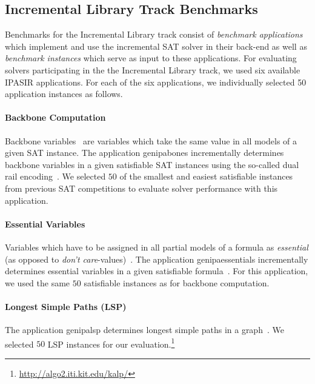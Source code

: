 \documentclass{elsarticle}
\begin{document}
\subsection{Incremental Library Track Benchmarks}

Benchmarks for the Incremental Library track consist of \emph{benchmark applications} which implement and use the incremental SAT solver in their back-end as well as \emph{benchmark instances} which serve as input to these applications. 
For evaluating solvers participating in the 
the Incremental Library track, we used six available IPASIR applications.
For each of the six applications, we individually selected 50 application instances as follows. 

\paragraph{Backbone Computation}

Backbone variables~\cite{Monasson:1999,Janota:2015:Backbones} are variables which take the same value in all models of a given SAT instance.
The application \textsf{genipabones} incrementally determines backbone variables in a given satisfiable SAT instances using the so-called 
dual rail encoding~\cite{Balyo:2015:SATRace}.
We selected $50$ of the smallest and easiest satisfiable instances from previous SAT competitions to evaluate solver performance with this application. 

\paragraph{Essential Variables}

Variables which have to be assigned in all partial models of a formula as \emph{essential} (as opposed to \emph{don't care}-values)~\cite{Bryant:1987:Essentials}. 
The application \textsf{genipaessentials} incrementally determines essential variables in a given satisfiable formula~\cite{Balyo:2015:SATRace}. 
For this application, we used the same $50$  satisfiable instances as for  backbone computation.

\paragraph{Longest Simple Paths (LSP)}

The application \textsf{genipalsp} determines longest simple paths in a graph~\cite{Balyo:2019:LSP}. 
We selected $50$ LSP instances for our evaluation.\footnote{\url{http://algo2.iti.kit.edu/kalp/}} 
\end{document}
